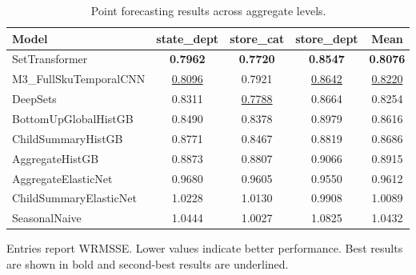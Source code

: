 \begin{table}[H]
\centering
\caption{Point forecasting results across aggregate levels.}
\label{tab:main_point}
\begin{threeparttable}
\begin{tabular}{lcccc}
\toprule
Model & state\_dept & store\_cat & store\_dept & Mean \\
\midrule
SetTransformer & \textbf{0.7962} & \textbf{0.7720} & \textbf{0.8547} & \textbf{0.8076} \\
M3\_FullSkuTemporalCNN & \underline{0.8096} & 0.7921 & \underline{0.8642} & \underline{0.8220} \\
DeepSets & 0.8311 & \underline{0.7788} & 0.8664 & 0.8254 \\
BottomUpGlobalHistGB & 0.8490 & 0.8378 & 0.8979 & 0.8616 \\
ChildSummaryHistGB & 0.8771 & 0.8467 & 0.8819 & 0.8686 \\
AggregateHistGB & 0.8873 & 0.8807 & 0.9066 & 0.8915 \\
AggregateElasticNet & 0.9680 & 0.9605 & 0.9550 & 0.9612 \\
ChildSummaryElasticNet & 1.0228 & 1.0130 & 0.9908 & 1.0089 \\
SeasonalNaive & 1.0444 & 1.0027 & 1.0825 & 1.0432 \\
\bottomrule
\end{tabular}
\begin{tablenotes}
\footnotesize \item Entries report WRMSSE. Lower values indicate better performance. Best results are shown in bold and second-best results are underlined.
\end{tablenotes}
\end{threeparttable}
\end{table}
